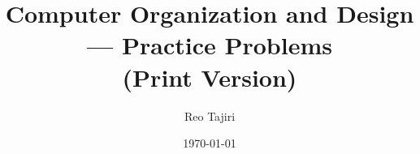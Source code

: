 \documentclass[10pt]{article}
\title{Computer Organization and Design --- Practice Problems\\
\large (Print Version)}
\author{Reo Tajiri}
\date{\today}
\newcommand{\headerlinkprefix}{sol}
\newcommand{\headerrightlabel}{Solution}
\begin{document}
\maketitle
\pagestyle{plain}
\hypertarget{toc}{}
\tableofcontents
\newpage
\pagestyle{fancy}






\renewcommand{\headerlinkprefix}{prob}
\renewcommand{\headerrightlabel}{Problem}




\end{document}

